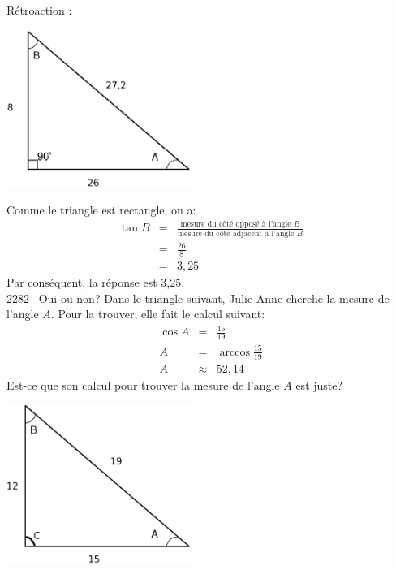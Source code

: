 \documentclass[letterpaper, 12pt]{article}
\begin{document}
R\'etroaction :\\
\begin{center}
 \includegraphics[width=6cm,bb=14 14 442 370]{Triangle_rectangle2281.eps}
\end{center}
Comme le triangle est rectangle, on a:
\begin{eqnarray*}
 \tan{B}&=&\frac{\textrm{mesure du c\^ot\'e oppos\'e \`a l'angle $B$}}{\textrm{mesure du c\^ot\'e adjacent \`a l'angle $B$}}\\
&=&\frac{26}{8}\\[2mm]
&=&3,25
\end{eqnarray*}
Par cons\'equent, la r\'eponse est 3,25.\\


2282-- Oui ou non? Dans le triangle suivant, Julie-Anne cherche la mesure de l'angle $A$. Pour la trouver, elle fait le calcul suivant:
\begin{eqnarray*}
\cos{A}&=&\frac{15}{19}\\
A&=&\arccos{\frac{15}{19}}\\
A&\approx&52,14
\end{eqnarray*}
Est-ce que son calcul pour trouver la mesure de l'angle $A$ est juste?\\
\begin{center}
 \includegraphics[width=6cm,bb=14 14 607 535]{Triangle_rectangle2282.eps}
\end{center}
\end{document}
